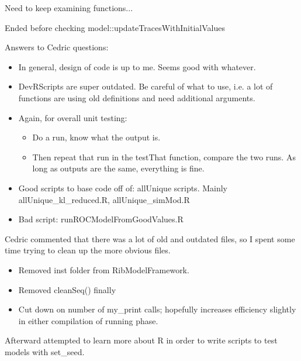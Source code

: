 \documentclass[12pt,hyperref]{labbook}
\newcommand{\sep}{\discretionary{}{}{}} %
\begin{document}
Need to keep examining functions... 

Ended before checking model::updateTracesWithInitialValues


Answers to Cedric questions:
\begin{itemize}
    \item In general, design of code is up to me. Seems good with whatever.
    \item DevRScripts are super outdated. Be careful of what to use, i.e. a lot of functions
    are using old definitions and need additional arguments.
    \item Again, for overall unit testing:
    \begin{itemize}
        \item Do a run, know what the output is.
        \item 
        Then repeat that run in the testThat function, compare the two runs. As long as outputs are the same, everything is fine.
    \end{itemize}
    \item Good scripts to base code off of: all\sep Unique scripts.
    Mainly all\sep Unique\sep \_\sep kl\sep \_\sep reduced.R, 
    all\sep Unique\sep \_\sep sim\sep Mod.R
    \item Bad script: runROCModelFromGoodValues.R
\end{itemize}

Cedric commented that there was a lot of old and outdated files, so I spent some time
trying to clean up the more obvious files.

\begin{itemize}
    \item Removed inst folder from RibModelFramework.
    \item Removed cleanSeq() finally
    \item Cut down on number of my\_print calls; hopefully increases efficiency slightly
    in either compilation of running phase.
\end{itemize}

Afterward attempted to learn more about R in order to write scripts to test models with set\_seed.
\end{document}
